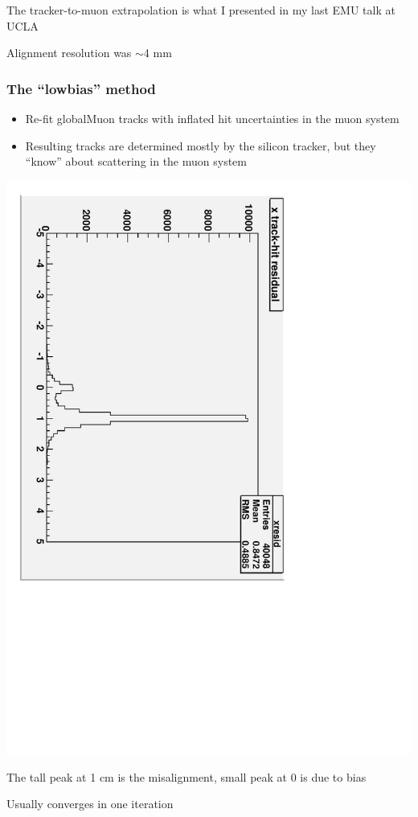\documentclass[compress]{beamer}
\begin{document}
\begin{notes}
\item The tracker-to-muon extrapolation is what I presented in my last EMU talk at UCLA
\item Alignment resolution was $\sim$4 mm
\end{notes}

\begin{frame}
\frametitle{The ``lowbias'' method}
\begin{itemize}
\item Re-fit globalMuon tracks with inflated hit uncertainties in the muon system
\item Resulting tracks are determined mostly by the silicon tracker, but they ``know'' about scattering in the muon system
\end{itemize}
\begin{center}
\includegraphics[height=0.7\linewidth, angle=90]{realplots/bias_residual_lowbias}
\end{center}
\end{frame}

\begin{notes}
\item The tall peak at 1 cm is the misalignment, small peak at 0 is due to bias
\item Usually converges in one iteration
\end{notes}
\end{document}
